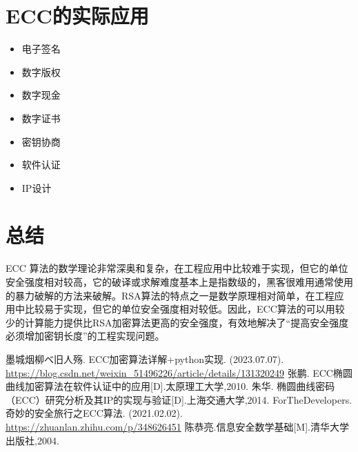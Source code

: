 \documentclass[a4paper]{article}
\begin{document}
\section{ECC的实际应用}
\begin{itemize}
    \item 电子签名
    \item 数字版权
    \item 数字现金
    \item 数字证书
    \item 密钥协商
    \item 软件认证
    \item IP设计
\end{itemize}
\section{总结}
ECC 算法的数学理论非常深奥和复杂，在工程应用中比较难于实现，但它的单位安全强度相对较高，它的破译或求解难度基本上是指数级的，黑客很难用通常使用的暴力破解的方法来破解。RSA算法的特点之一是数学原理相对简单，在工程应用中比较易于实现，但它的单位安全强度相对较低。因此，ECC算法的可以用较少的计算能力提供比RSA加密算法更高的安全强度，有效地解决了“提高安全强度必须增加密钥长度”的工程实现问题。
\begin{thebibliography}{1000}  
    
    墨城烟柳ベ旧人殇. ECC加密算法详解+python实现. (2023.07.07). \\\url{https://blog.csdn.net/weixin_51496226/article/details/131320249}
    张鹏. ECC椭圆曲线加密算法在软件认证中的应用[D].太原理工大学,2010.
    朱华. 椭圆曲线密码（ECC）研究分析及其IP的实现与验证[D].上海交通大学,2014.
    ForTheDevelopers. 奇妙的安全旅行之ECC算法. (2021.02.02). \\\url{https://zhuanlan.zhihu.com/p/348626451}
    陈恭亮.信息安全数学基础[M].清华大学出版社,2004.

\end{thebibliography}
\end{document}
